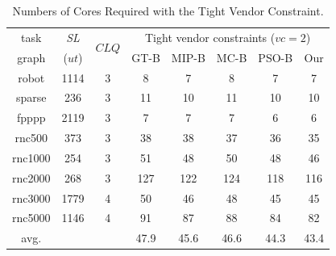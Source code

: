 \documentclass[10pt,journal, compsoc]{IEEEtran}
\begin{document}
\begin{table}[h]
\renewcommand{\arraystretch}{1.1}
\caption{Numbers of Cores Required with the Tight Vendor Constraint.}
\centering
\begin{tabular}{c|c|c|ccccc}
\hline
\hline

task       &\textit{SL}     &\multicolumn{1}{c|}{\multirow{2}{*}{\hspace{-0.2em}$CLQ$\hspace{-0.2em}}}       & \multicolumn{5}{c}{Tight vendor constraints ($vc=2$)}    \\   \cline{4-8}

graph                           &($ut$)          &             &GT-B   &MIP-B &MC-B  &PSO-B &Our            \\
\hline
\hline

robot              &1114    &3                &8      &7   &8  &7   &7   \\

sparse              &236    &3                &11      &10   &11  &10   &10    \\

fpppp              &2119    &3               & 7     &7   &7  &6   &6   \\

rnc500            &373      &3                &38      &38   &37  &36   &35   \\

rnc1000            &254     &3                   &51      &48   &50  &48   &46   \\

rnc2000           &268      &3                  &127      &122   &124  &118   &116   \\

rnc3000           &1779     &4                &50      &46   &48  &45   &45   \\

rnc5000           &1146     &4                &91      &87   &88  &84   &82   \\

\hline
avg.              &         &                   &47.9      &45.6   &46.6  &44.3   &43.4   \\
\hline
\hline
\end{tabular}
\label{table:core_usage_tight}
\end{table}
\end{document}

